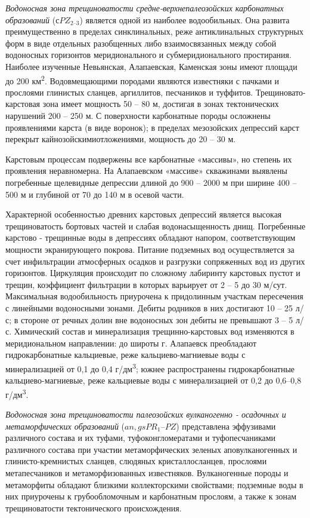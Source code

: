 \documentclass[a4paper,12pt]{article} %
\begin{document}
\textit{Водоносная зона трещиноватости средне-верхнепалеозойских карбонатных образований} ($сPZ_{2–3}$) является одной из наиболее водообильных. Она развита преимущественно в пределах синклинальных, реже антиклинальных структурных форм в виде отдельных разобщенных либо взаимосвязанных между собой водоносных горизонтов меридионального и субмеридионального простирания. Наиболее изученные Невьянская, Алапаевская,
Каменская зоны имеют площади до 200 км\textsuperscript{2}. Водовмещающими породами являются известняки с пачками и прослоями глинистых сланцев, аргиллитов, песчаников и туффитов. Трещиновато-карстовая зона имеет мощность 50 – 80 м, достигая в зонах тектонических нарушений 200 – 250 м. С поверхности карбонатные породы осложнены проявлениями карста (в виде воронок); в пределах мезозойских депрессий карст перекрыт кайнозойскимиотложениями, мощность до 20 – 30 м.

Карстовым процессам подвержены все карбонатные «массивы», но степень их проявления неравномерна. На Алапаевском «массиве» скважинами выявлены погребенные щелевидные депрессии длиной до 900 – 2000 м
при ширине 400 – 500 м и глубиной от 70 до 140 м в осевой части.

Характерной особенностью древних карстовых депрессий является высокая трещиноватость бортовых частей и слабая водонасыщенность днищ. Погребенные карстово - трещинные воды в депрессиях обладают напором, соответствующим мощности экранирующего покрова. Питание подземных вод осуществляется за счет инфильтрации атмосферных осадков и разгрузки сопряженных вод из других горизонтов. Циркуляция происходит по сложному лабиринту карстовых пустот и трещин, коэффициент фильтрации в которых варьирует от 2 – 5 до 30 м/сут. Максимальная водообильность приурочена к придолинным участкам пересечения с линейными водоносными зонами. Дебиты родников в них достигают 10 – 25 л/с; в стороне от речных долин вне водоносных зон дебиты не превышают 3 – 5 л/с. Химический состав и минерализация трещинно-карстовых вод изменяются в меридиональном направлении: до широты г. Алапаевск преобладают гидрокарбонатные кальциевые, реже кальциево-магниевые воды с минерализацией от 0,1 до 0,4 г/дм\textsuperscript{3}; южнее распространены гидрокарбонатные кальциево-магниевые, реже кальциевые воды с минерализацией от 0,2 до 0,6–0,8 г/дм\textsuperscript{3}.

\textit{Водоносная зона трещиноватости палеозойских вулканогенно - осадочных и метаморфических образований} ($an, gsPR_1–PZ$) представлена эффузивами различного состава и их туфами, туфоконгломератами и туфопесчаниками различного состава при участии метаморфических зеленых аповулканогенных и глинисто-кремнистых сланцев, слюдяных кристаллосланцев, прослоями метапесчаников и метаморфизованных известняков. Вулканогенные породы и метаморфиты обладают близкими коллекторскими свойствами; подземные воды в них приурочены к грубообломочным и карбонатным прослоям, а также к зонам трещиноватости тектонического происхождения. 
\end{document}
